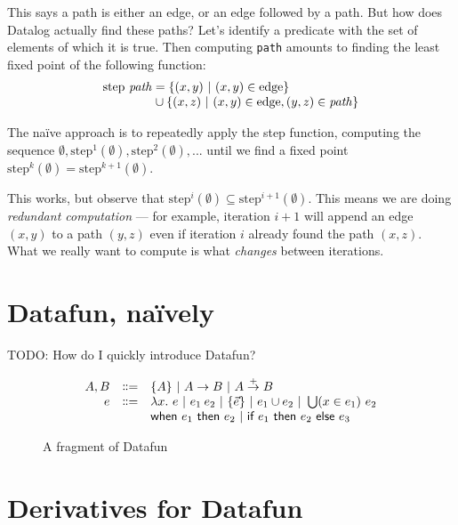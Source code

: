 \documentclass[sigplan,screen,review,timestamp,dvipsnames]{acmart}
\newcommand{\todo}[1]{{\color{ACMPurple}#1}}
\newcommand{\bnfeq}{\dblcolon=}
\newcommand{\bnfcont}{}
\newcommand{\pipe}{~|~}
\newcommand{\fn}{\lambda}
\newcommand{\binder}{.~}
\newcommand{\bind}[1]{#1\binder}
\newcommand{\fnof}[1]{\fn\bind{#1}}
\newcommand{\setfor}[2]{\{#1 ~|~ #2\}}
\newcommand{\kw}[1]{\textsf{#1}}
\newcommand{\tlv}[1]{\textrm{#1}}
\newcommand{\var}[1]{\mathit{#1}}
\newcommand{\mto}{\overset{+}{\to}}
\newcommand{\tset}[1]{\{#1\}}
\newcommand{\eset}[1]{\{#1\}}
\newcommand{\ewhen}[1]{\kw{when}~#1~\kw{then}~}
\newcommand{\eif}[2]{\kw{if}~#1~\kw{then}~#2~\kw{else}~}
\begin{document}
This says a path is either an edge, or an edge followed by a path. But how does
Datalog actually find these paths? Let's identify a predicate with the set of
elements of which it is true. Then computing \texttt{path} amounts to finding
the least fixed point of the following function:
%
\[
\begin{array}{l}
  \tlv{step}~ \var{path} = \setfor{(x,y)}{(x,y) \in \tlv{edge}}\\
  \phantom{\tlv{step}~ \var{path}} \hspace{.5pt}\cup
  \setfor{(x,z)}{(x,y) \in \tlv{edge}, (y,z) \in \var{path}}
\end{array}
\]

The na\"ive approach is to repeatedly apply the \tlv{step} function, computing
the sequence $\emptyset, \tlv{step}^1(\emptyset), \tlv{step}^2(\emptyset), ...$
until we find a fixed point $\tlv{step}^k(\emptyset) =
\tlv{step}^{k+1}(\emptyset)$.

This works, but observe that $\tlv{step}^i(\emptyset) \subseteq
\tlv{step}^{i+1}(\emptyset)$. This means we are doing \emph{redundant
  computation} --- for example, iteration $i+1$ will append an edge $(x,y)$ to a
path $(y,z)$ even if iteration $i$ already found the path $(x,z)$. What we
really want to compute is what \emph{changes} between iterations.




\section{Datafun, na\"ively}

\todo{TODO: How do I quickly introduce Datafun?}

\begin{figure}
  \[
  \begin{array}{rcl}
    A,B &\bnfeq& \tset{A} \pipe A \to B \pipe A \mto B
    \\
    e &\bnfeq& \fnof{x} e \pipe e_1\:e_2 \pipe \eset{\vec{e}} \pipe e_1 \cup e_2
    \pipe \bigcup(x \in e_1)~ e_2
    \\ &\bnfcont& \ewhen{e_1} e_2 \pipe \eif{e_1}{e_2}{e_3}
  \end{array}
  \]\vspace{-1em}
  \caption{A fragment of Datafun}
  \label{fig:datafun}
\end{figure}


\section{Derivatives for Datafun}
\end{document}

